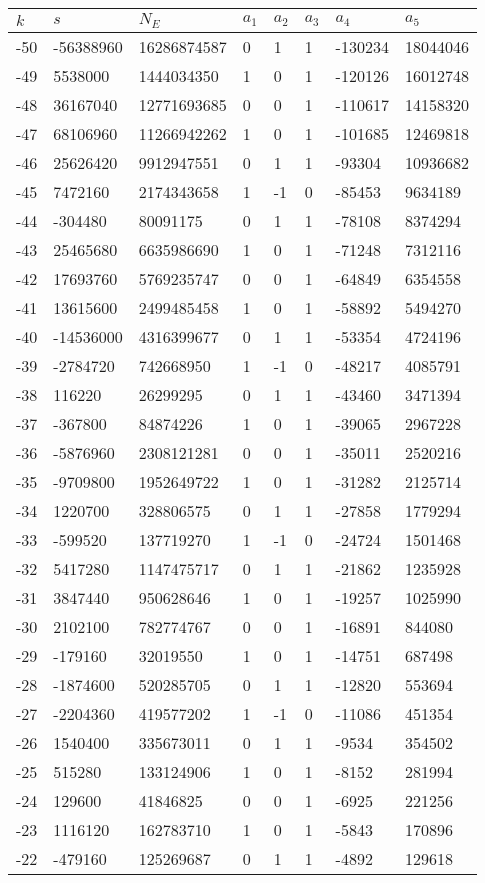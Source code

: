 \documentclass{amsart}
\begin{document}
\begin{longtable}{|l|l|l|lllll|}
\hline
$k$ & $s$ & $N_E$ & $a_1$ & $a_2$ & $a_3$ & $a_4$ & $a_5$\\
\hline
-50&-56388960&16286874587&0&1&1&-130234&18044046\\
-49&5538000&1444034350&1&0&1&-120126&16012748\\
-48&36167040&12771693685&0&0&1&-110617&14158320\\
-47&68106960&11266942262&1&0&1&-101685&12469818\\
-46&25626420&9912947551&0&1&1&-93304&10936682\\
-45&7472160&2174343658&1&-1&0&-85453&9634189\\
-44&-304480&80091175&0&1&1&-78108&8374294\\
-43&25465680&6635986690&1&0&1&-71248&7312116\\
-42&17693760&5769235747&0&0&1&-64849&6354558\\
-41&13615600&2499485458&1&0&1&-58892&5494270\\
-40&-14536000&4316399677&0&1&1&-53354&4724196\\
-39&-2784720&742668950&1&-1&0&-48217&4085791\\
-38&116220&26299295&0&1&1&-43460&3471394\\
-37&-367800&84874226&1&0&1&-39065&2967228\\
-36&-5876960&2308121281&0&0&1&-35011&2520216\\
-35&-9709800&1952649722&1&0&1&-31282&2125714\\
-34&1220700&328806575&0&1&1&-27858&1779294\\
-33&-599520&137719270&1&-1&0&-24724&1501468\\
-32&5417280&1147475717&0&1&1&-21862&1235928\\
-31&3847440&950628646&1&0&1&-19257&1025990\\
-30&2102100&782774767&0&0&1&-16891&844080\\
-29&-179160&32019550&1&0&1&-14751&687498\\
-28&-1874600&520285705&0&1&1&-12820&553694\\
-27&-2204360&419577202&1&-1&0&-11086&451354\\
-26&1540400&335673011&0&1&1&-9534&354502\\
-25&515280&133124906&1&0&1&-8152&281994\\
-24&129600&41846825&0&0&1&-6925&221256\\
-23&1116120&162783710&1&0&1&-5843&170896\\
-22&-479160&125269687&0&1&1&-4892&129618\\

\end{longtable}
\end{document}
